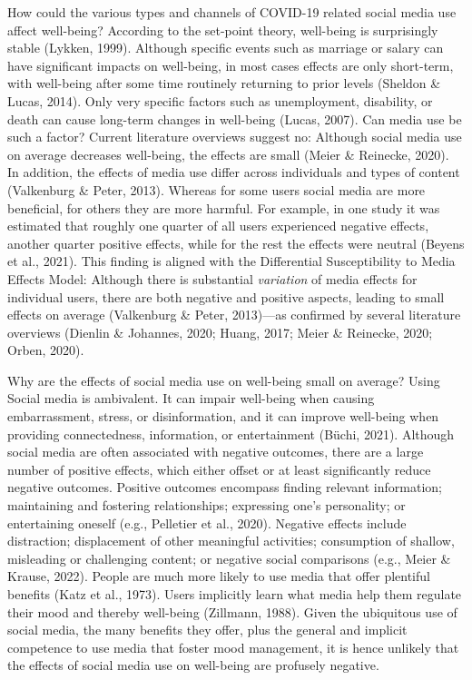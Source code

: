 \documentclass[
  man,floatsintext]{apa7}
\begin{document}
How could the various types and channels of COVID-19 related social media use affect well-being?
According to the set-point theory, well-being is surprisingly stable (Lykken, 1999).
Although specific events such as marriage or salary can have significant impacts on well-being, in most cases effects are only short-term, with well-being after some time routinely returning to prior levels (Sheldon \& Lucas, 2014).
Only very specific factors such as unemployment, disability, or death can cause long-term changes in well-being (Lucas, 2007).
Can media use be such a factor?
Current literature overviews suggest no:
Although social media use on average decreases well-being, the effects are small (Meier \& Reinecke, 2020).
In addition, the effects of media use differ across individuals and types of content (Valkenburg \& Peter, 2013).
Whereas for some users social media are more beneficial, for others they are more harmful.
For example, in one study it was estimated that roughly one quarter of all users experienced negative effects, another quarter positive effects, while for the rest the effects were neutral (Beyens et al., 2021).
This finding is aligned with the Differential Susceptibility to Media Effects Model:
Although there is substantial \emph{variation} of media effects for individual users, there are both negative and positive aspects, leading to small effects on average (Valkenburg \& Peter, 2013)---as confirmed by several literature overviews (Dienlin \& Johannes, 2020; Huang, 2017; Meier \& Reinecke, 2020; Orben, 2020).

Why are the effects of social media use on well-being small on average?
Using Social media is ambivalent.
It can impair well-being when causing embarrassment, stress, or disinformation, and it can improve well-being when providing connectedness, information, or entertainment (Büchi, 2021).
Although social media are often associated with negative outcomes, there are a large number of positive effects, which either offset or at least significantly reduce negative outcomes.
Positive outcomes encompass finding relevant information; maintaining and fostering relationships; expressing one's personality; or entertaining oneself (e.g., Pelletier et al., 2020).
Negative effects include distraction; displacement of other meaningful activities; consumption of shallow, misleading or challenging content; or negative social comparisons (e.g., Meier \& Krause, 2022).
People are much more likely to use media that offer plentiful benefits (Katz et al., 1973).
Users implicitly learn what media help them regulate their mood and thereby well-being (Zillmann, 1988).
Given the ubiquitous use of social media, the many benefits they offer, plus the general and implicit competence to use media that foster mood management, it is hence unlikely that the effects of social media use on well-being are profusely negative.
\end{document}
